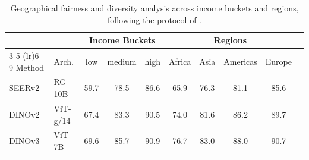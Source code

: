 \begin{table}[t]
    \centering
    \caption{Geographical fairness and diversity analysis across income buckets and regions, following the protocol of \citet{goyal2022fairness}.
    }
    \label{tab:results-geographical-fairness}
    \begin{tabular}{llc ccc cccc}
        \toprule
        & & \multicolumn{3}{c}{Income Buckets} & \multicolumn{4}{c}{Regions} \\
        \cmidrule(lr){3-5} \cmidrule(lr){6-9}
        Method & Arch. & low & medium & high & Africa & Asia & Americas & Europe \\
        \midrule
        SEERv2 & RG-10B & 59.7 & 78.5 & 86.6 & 65.9 & 76.3 & 81.1 & 85.6 \\
        \midrule
        DINOv2 & ViT-g/14 & 67.4 & 83.3 & 90.5 & 74.0 & 81.6 & 86.2 & 89.7  \\
        DINOv3 & ViT-7B & 69.6 & 85.7 & 90.9 & 76.7 & 83.0 & 88.0 & 90.7  \\
        \bottomrule
    \end{tabular}
\end{table}


